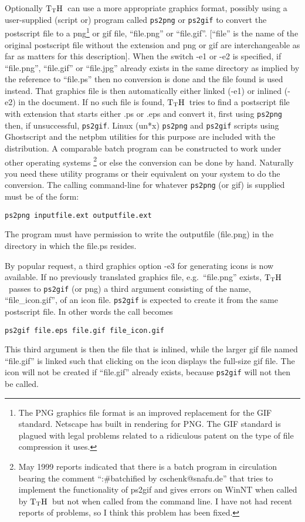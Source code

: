 \documentclass[12pt]{article}
\def\TtH{$\rm{}T_TH$}
\begin{document}
 Optionally \TtH\ can use a more appropriate
graphics format, possibly using a user-supplied (script or) program
called \verb|ps2png| or \verb|ps2gif| to convert the postscript file
to a png\footnote{The PNG graphics file format is an improved
replacement for the GIF standard. Netscape has built in rendering for
PNG. The GIF standard is plagued with legal problems related to a
ridiculous patent on the type of file compression it uses.}  or gif
file, ``file.png'' or ``file.gif''. [``file'' is the name of the
original postscript file without the extension and png or gif are
interchangeable as far as matters for this
description]. When the switch -e1 or -e2 is specified, if
``file.png'', ``file.gif'' or ``file.jpg'' already exists in the same
directory as implied by the reference to ``file.ps'' then no
conversion is done and the file found is used instead.  That graphics
file is then automatically either linked (-e1) or inlined (-e2) in the
document. If no such file is found, \TtH\ tries to find a postscript
file with extension that starts either .ps or .eps and convert it,
first using \verb|ps2png| then, if unsuccessful, \verb|ps2gif|.  Linux
(un*x) \verb|ps2png| and \verb|ps2gif| scripts using Ghostscript and
the netpbm utilities for this purpose are included with the
distribution.  A comparable batch program can be constructed to work
under other operating systems
\footnote{\label{ps2gifprob}May 1999 reports indicated that there is a
batch program in circulation bearing the comment ``:\#batchified by
cschenk@snafu.de'' that tries to implement the functionality of ps2gif
and gives errors on WinNT when called by \TtH\ but not when called from
the command line. I have not had recent reports of problems, so I
think this problem has been fixed.}  or else the conversion can be done by
hand. Naturally you need these utility programs or their equivalent on
your system to do the conversion.  The calling command-line for
whatever \verb|ps2png| (or gif) is supplied must be of the form:
\begin{verbatim}ps2png inputfile.ext outputfile.ext\end{verbatim}
 The program must
have permission to write the outputfile (file.png) in the directory in
which the file.ps resides. 


By popular request, a third graphics option -e3 for generating icons is
now available. If no previously translated graphics file,
e.g.~``file.png''  exists, \TtH\ passes to \verb|ps2gif| (or png) a third
argument consisting of the name, ``file\_icon.gif'', of an icon file.
\verb|ps2gif| is expected to create it from the same postscript file. In
other words the call becomes
\begin{verbatim}ps2gif file.eps file.gif file_icon.gif\end{verbatim}
 This third argument is then the file that is
inlined, while the larger gif file named ``file.gif'' is linked such
that clicking on the icon displays the full-size gif file. The icon
will not be created if ``file.gif'' already exists, because
\verb|ps2gif| will not then be called.
\end{document}
